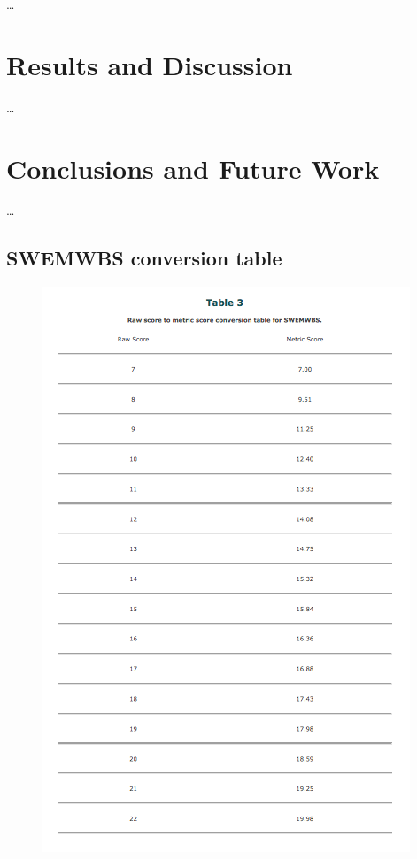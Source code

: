 \documentclass[11pt,openright,a4paper]{report}
\begin{document}
\ldots


\chapter{Results and Discussion}

\ldots


\chapter{Conclusions and Future Work}

\ldots

\printbibliography

\begin{appendices}
\section{SWEMWBS conversion table} \label{SWEMWBS conversion table}
\begin{figure}[ht]
  \centering
  \includegraphics[width =.7\textwidth]{i/swemwbsconversiontable1.png}
  \label{swemwbsconversiontable}
\end{figure}


\end{appendices}
\end{document}
